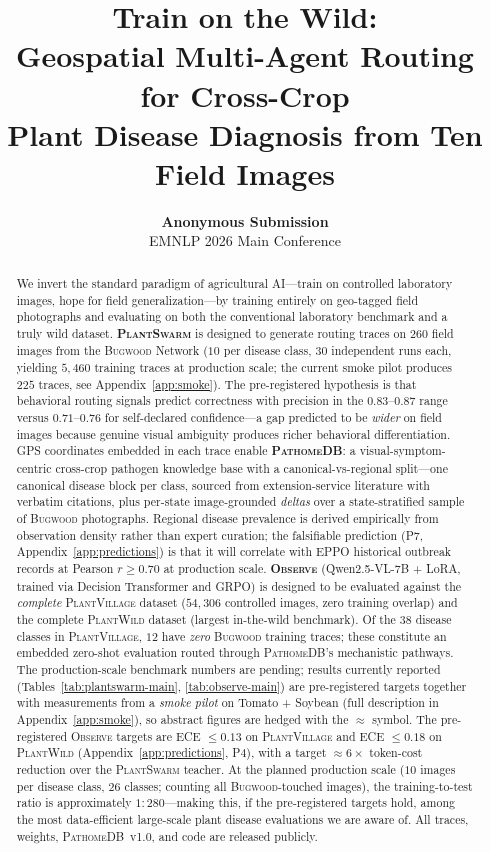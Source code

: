 \documentclass[11pt,twocolumn]{article}
\title{\vspace{-1em}\textbf{Train on the Wild:\\
Geospatial Multi-Agent Routing for Cross-Crop\\
Plant Disease Diagnosis from Ten Field Images}}
\author{\textbf{Anonymous Submission}\\EMNLP 2026 Main Conference}
\date{}
\newcommand{\observe}{\textsc{Observe}\xspace}
\newcommand{\plantswarm}{\textsc{PlantSwarm}\xspace}
\newcommand{\pathomedb}{\textsc{PathomeDB}\xspace}
\newcommand{\bugwood}{\textsc{Bugwood}\xspace}
\newcommand{\pv}{\textsc{PlantVillage}\xspace}
\newcommand{\pw}{\textsc{PlantWild}\xspace}
\begin{document}
\sloppy
\hfuzz=3pt
\maketitle
\thispagestyle{empty}

\begin{abstract}
\noindent
We invert the standard paradigm of agricultural
AI---train on controlled laboratory images, hope
for field generalization---by training entirely on
geo-tagged field photographs and evaluating on
both the conventional laboratory benchmark and a
truly wild dataset.
\textbf{\plantswarm} is designed to generate routing
traces on $260$ field images from the \bugwood
Network ($10$ per disease class, $30$ independent
runs each, yielding $5{,}460$ training traces at
production scale; the current smoke pilot produces
$225$ traces, see Appendix~\ref{app:smoke}). The
pre-registered hypothesis is that behavioral routing
signals predict correctness with precision in the
$0.83$--$0.87$ range versus $0.71$--$0.76$ for
self-declared confidence---a gap predicted to be
\emph{wider} on field images because genuine visual
ambiguity produces richer behavioral differentiation.
GPS coordinates embedded in each trace enable
\textbf{\pathomedb}: a visual-symptom-centric
cross-crop pathogen knowledge base with a
canonical-vs-regional split---one canonical disease
block per class, sourced from extension-service
literature with verbatim citations, plus per-state
image-grounded \emph{deltas} over a state-stratified
sample of \bugwood photographs. Regional disease prevalence is derived empirically
from observation density rather than expert
curation; the falsifiable prediction (P7,
Appendix~\ref{app:predictions}) is that it will
correlate with EPPO historical outbreak records at
Pearson $r{\geq}0.70$ at production scale.
\textbf{\observe} (Qwen2.5-VL-7B + LoRA, trained
via Decision Transformer and GRPO) is designed to be
evaluated against the \emph{complete} \pv dataset
($54{,}306$ controlled images, zero training overlap)
and the complete \pw dataset (largest in-the-wild
benchmark). Of the $38$ disease classes in \pv, $12$
have \emph{zero} \bugwood training traces; these
constitute an embedded zero-shot evaluation routed
through \pathomedb's mechanistic pathways. The
production-scale benchmark numbers are pending;
results currently reported (Tables~\ref{tab:plantswarm-main},
\ref{tab:observe-main}) are pre-registered targets
together with measurements from a \emph{smoke pilot}
on Tomato + Soybean (full description in
Appendix~\ref{app:smoke}), so abstract figures are
hedged with the $\approx$ symbol. The
pre-registered \observe targets are ECE
${\leq}0.13$ on \pv and ECE ${\leq}0.18$ on \pw
(Appendix~\ref{app:predictions}, P4), with a target
${\approx}6\times$ token-cost reduction over the
\plantswarm teacher.
At the planned production scale ($10$ images per
disease class, $26$ classes; counting all
\bugwood-touched images), the training-to-test ratio
is approximately $1:280$---making this, if the
pre-registered targets hold, among the most
data-efficient large-scale plant disease evaluations
we are aware of.
All traces, weights, \pathomedb~v1.0, and code
are released publicly.
\end{abstract}
\end{document}

